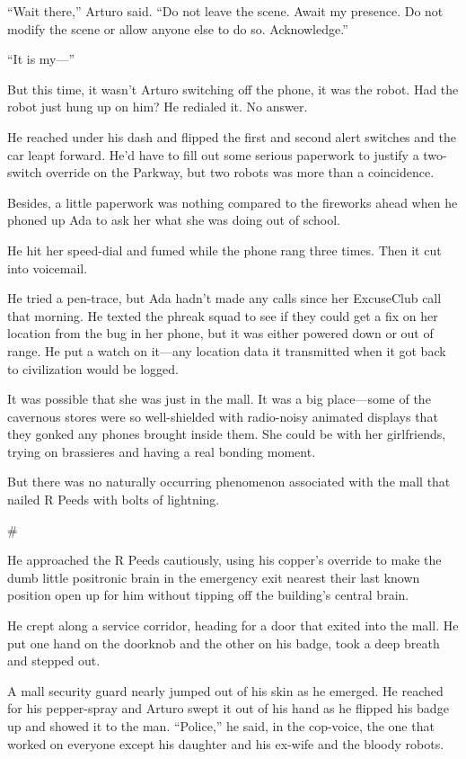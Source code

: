 “Wait there,” Arturo said. “Do not leave the scene. Await my
presence. Do not modify the scene or allow anyone else to do so.
Acknowledge.”

“It is my—”

But this time, it wasn’t Arturo switching off the phone, it was the
robot. Had the robot just hung up on him? He redialed it. No
answer.

He reached under his dash and flipped the first and second alert
switches and the car leapt forward. He’d have to fill out some
serious paperwork to justify a two-switch override on the Parkway,
but two robots was more than a coincidence.

Besides, a little paperwork was nothing compared to the fireworks
ahead when he phoned up Ada to ask her what she was doing out of
school.

He hit her speed-dial and fumed while the phone rang three times.
Then it cut into voicemail.

He tried a pen-trace, but Ada hadn’t made any calls since her
ExcuseClub call that morning. He texted the phreak squad to see if
they could get a fix on her location from the bug in her phone, but
it was either powered down or out of range. He put a watch on
it—any location data it transmitted when it got back to
civilization would be logged.

It was possible that she was just in the mall. It was a big
place—some of the cavernous stores were so well-shielded with
radio-noisy animated displays that they gonked any phones brought
inside them. She could be with her girlfriends, trying on
brassieres and having a real bonding moment.

But there was no naturally occurring phenomenon associated with the
mall that nailed R Peeds with bolts of lightning.

\#

He approached the R Peeds cautiously, using his copper’s override
to make the dumb little positronic brain in the emergency exit
nearest their last known position open up for him without tipping
off the building’s central brain.

He crept along a service corridor, heading for a door that exited
into the mall. He put one hand on the doorknob and the other on his
badge, took a deep breath and stepped out.

A mall security guard nearly jumped out of his skin as he emerged.
He reached for his pepper-spray and Arturo swept it out of his hand
as he flipped his badge up and showed it to the man. “Police,” he
said, in the cop-voice, the one that worked on everyone except his
daughter and his ex-wife and the bloody robots.

